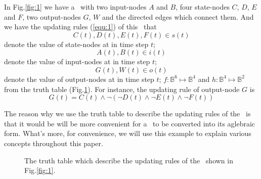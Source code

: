 \begin{example}
In Fig.\ref{fig:1} we have a \BCN\ with two input-nodes $A$ and $B$, four state-nodes $C$, $D$, $E$ and $F$, two output-nodes $G$, $W$ and the directed edges which connect them. And we have the updating rules (\ref{equ:1}) of this \BCN\ that \[C(t), D(t), E(t), F(t)\in s(t)\] denote the value of state-nodes at in time step $t$;
\[A(t), B(t)\in i(t)\] denote the value of input-nodes at in time step $t$;
\[G(t), W(t)\in o(t)\] denote the value of output-nodes at in time step $t$;
$f:\mathbb{B}^{6}\mapsto \mathbb{B}^4$ and $h:\mathbb{B}^4\mapsto \mathbb{B}^2$ from the truth table (Fig.\ref{fig:2}).  For instance, the updating rule of output-node $G$ is 
\[G(t)=C(t)\wedge \neg(\neg{D(t)}\wedge \neg E(t)\wedge \neg F(t))\]
	
The reason why we use the truth table to describe the updating rules of the \BCN\ is that it would be will be more convenient for a \BCN\ to be converted into its aglebraic form. What's more, for convenience, we will use this example to explain various concepts throughout this paper.
  \begin{figure}[thpb]
      \centering
      
      \caption{The truth table which describe the updating rules of the \BCN\ shown in Fig.\ref{fig:1}.}
      \label{fig:2}
   \end{figure}
\end{example}   


